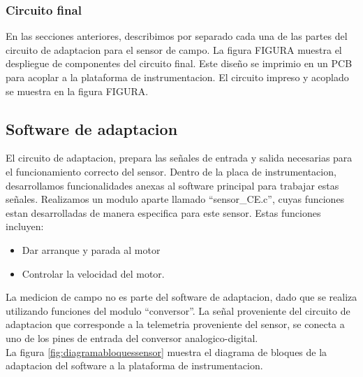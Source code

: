 
\subsubsection{Circuito final} %
\label{it6:ssub:circuito_final}

En las secciones anteriores, describimos por separado cada una de las partes del circuito de adaptacion para el sensor de campo. La figura FIGURA muestra el despliegue de componentes del circuito final. Este diseño se imprimio en un PCB para acoplar a la plataforma de instrumentacion. El circuito impreso y acoplado se muestra en la figura FIGURA.





\subsection{Software de adaptacion} %
\label{it6:sec:software_de_adaptacion}


El circuito de adaptacion, prepara las señales de entrada y salida necesarias para el funcionamiento correcto del sensor. Dentro de la placa de instrumentacion, desarrollamos funcionalidades anexas al software principal para trabajar estas señales.
Realizamos un modulo aparte llamado ``sensor\_CE.c'', cuyas funciones estan desarrolladas de manera especifica para este sensor. Estas funciones incluyen:

\begin{itemize}
  \item Dar arranque y parada al motor
  \item Controlar la velocidad del motor.
\end{itemize}

La medicion de campo no es parte del software de adaptacion, dado que se realiza utilizando funciones del modulo ``conversor''. La señal proveniente del circuito de adaptacion que corresponde a la telemetria proveniente del sensor, se conecta a uno de los pines de entrada del conversor analogico-digital. \\

La figura \ref{fig:diagramabloquessensor} muestra el diagrama de bloques de la adaptacion del software a la plataforma de instrumentacion.

